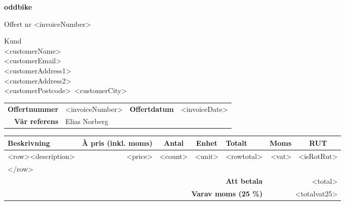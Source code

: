 \documentclass[a4paper,11pt]{extarticle}
\newcommand{\changefont}{%
        \fontsize{9}{11}\selectfont
    }
\begin{document}
\pagestyle{fancy}
\fancyhf{} %
\renewcommand{\headrulewidth}{0pt}
\renewcommand{\footrulewidth}{0pt}

\setlength{\fboxsep}{1.5em}
\setlength{\parindent}{0pt}

{\color{OliveGreen}
\fontsize{48}{0}\selectfont
\hspace{-0.6em}
\textbf{
oddbike}}

\vspace{2em}
\begin{minipage}[t]{0.45\textwidth}
{\huge
Offert nr <invoiceNumber> \\
}
    \vspace{2em}
\end{minipage}
\begin{minipage}[t]{0.3\textwidth}
{\huge Kund}\\

<customerName>\\
<customerEmail>\\
<customerAddress1>\\
<customerAddress2>\\
<customerPostcode>~<customerCity>\\
\end{minipage}

\renewcommand\arraystretch{1.5}
\begin{tabular*}{\linewidth}{rlrl}
\hline
    \textbf{Offertnummer} & <invoiceNumber> & \textbf{Offertdatum} & <invoiceDate> \\
    \textbf{Vår referens} & Elias Norberg & &\\
\hline
\end{tabular*}

\begin{tabularx}{\textwidth}{Xrrrrrc}
\rowcolor{Gray}
\changefont \textbf{Beskrivning} &
\multicolumn{1}{l}{\changefont \textbf{À pris (inkl. moms)}} &
\multicolumn{1}{c}{\changefont \textbf{Antal}} &
\multicolumn{1}{c}{\changefont \textbf{Enhet}} &
\multicolumn{1}{l}{\changefont \textbf{Totalt}} &
\multicolumn{1}{c}{\changefont \textbf{Moms}} &
\changefont \textbf{RUT}\\
\hline
    <row><description> & <price> & <count> & <unit> & <rowtotal> & <vat> & <isRotRut>\\
    </row>
    & & & & & & \\
\hline
    \multicolumn{5}{r}{\textbf{Att betala}} & \multicolumn{2}{r}{<total>} \\
    \multicolumn{5}{r}{\textbf{Varav moms (25 \%)}} & \multicolumn{2}{r}{<totalvat25>} \\
\hline
\end{tabularx}
\end{document}
